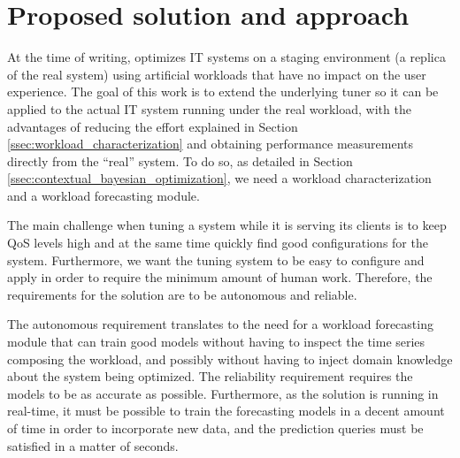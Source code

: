 \documentclass[a4paper, 12pt]{article} %
\begin{document}
	\section{Proposed solution and approach } \label{sec:proposed_solution}
	At the time of writing, \cite{AkamasCGP} optimizes IT systems on a staging environment (a replica of the real system) using artificial workloads that have no impact on the user experience. The goal of this work is to extend the underlying tuner so it can be applied to the actual IT system running under the real workload, with the advantages of reducing the effort explained in Section \ref{ssec:workload_characterization} and obtaining performance measurements directly from the ``real'' system. To do so, as detailed in Section \ref{ssec:contextual_bayesian_optimization}, we need a workload characterization and a workload forecasting module.
	
	The main challenge when tuning a system while it is serving its clients is to keep QoS levels high and at the same time quickly find good configurations for the system. Furthermore, we want the tuning system to be easy to configure and apply in order to require the minimum amount of human work. Therefore, the requirements for the solution are to be autonomous and reliable.
	
	The autonomous requirement translates to the need for a workload forecasting module that can train good models without having to inspect the time series composing the workload, and possibly without having to inject domain knowledge about the system being optimized. The reliability requirement requires the models to be as accurate as possible. Furthermore, as the solution is running in real-time, it must be possible to train the forecasting models in a decent amount of time in order to incorporate new data, and the prediction queries must be satisfied in a matter of seconds.
	
\end{document}
